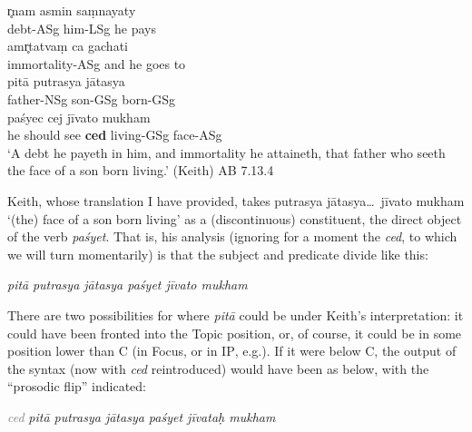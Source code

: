 \documentclass[output=paper,
modfonts
]{LSP/langsci}
\begin{document}
\begin{exe}
\ex\label{AB7}
	\gll r̥nam asmin saṃnayaty \\
		debt-ASg him-LSg {he pays} \\
		
	\gll amr̥tatvaṃ ca gachati \\
		immortality-ASg and {he goes to} \\
		
	\gll pitā putrasya jātasya \\
		father-NSg son-GSg born-GSg \\
		
	\gll paśyec cej jīvato mukham \\
		{he should see} \textbf{ced} living-GSg face-ASg \\
	\glt `A debt he payeth in him, and immortality he attaineth, that father who seeth the face of a son born living.' (Keith) \hfill {AB 7.13.4}
\end{exe}

\noindent Keith, whose translation I have provided, takes {\ob}putrasya jātasya\ldots\ jīvato mukham{\cb} `(the) face of a son born living' as a (discontinuous) constituent, the direct object of the verb \textit{paśyet}. That is, his analysis (ignoring for a moment
the \textit{ced}, to which we will turn momentarily) is that the subject and predicate divide like this:

\begin{exe}
	\ex
{\ob}\textit{pitā}{\cb} {\ob}\textit{putrasya jātasya paśyet jīvato mukham}{\cb}
\end{exe}

\noindent There are two possibilities for where \textit{pitā} could be under Keith's interpretation: it could have been fronted into the Topic position, or,
of course, it could be in some position lower than C (in Focus, or in \textsc{IP}, e.g.). If it were below C, the output
of the syntax (now with \textit{ced} reintroduced) would have been as below, with the ``prosodic flip'' indicated:

\vspace*{1ex}
\begin{exe}\ex
{\ob} {\textcolor{gray}{\textit{ced}}} {\ob}\textit{pitā  putrasya jātasya paśyet jīvataḥ mukham}{\cb}{\cb} 
\end{exe}
\end{document}
